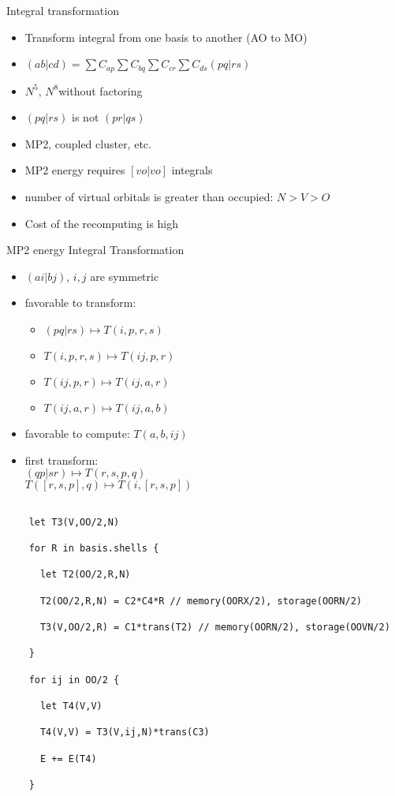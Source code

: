 \documentclass{beamer}
\begin{document}
\begin{frame}{   Integral transformation}
  \begin{itemize}
  \item Transform integral from one basis to another (AO to MO)
  \item $(ab|cd) = \sum C_{ap} \sum C_{bq} \sum C_{cr} \sum C_{ds} (pq|rs) $
  \item $N ^5 $, $N ^8 $without factoring
  \item $(pq|rs)$ is not $(pr|qs)$
  \item MP2, coupled cluster, etc.
  \item MP2  energy requires $[vo | vo] $ integrals
  \item number of virtual orbitals is greater than occupied:
    $N > V > O $
  \item Cost of the recomputing is high
  \end{itemize}
\end{frame}

\begin{frame}{MP2  energy Integral Transformation}
  \begin{itemize}
  \item $(ai|bj)$, $i,j$ are symmetric
  \item favorable to transform:
    \begin{itemize}
    \item $(pq|rs) \mapsto T(i,p,r,s)$
    \item $T(i,p,r,s) \mapsto T(ij,p,r)$
    \item $T(ij,p,r) \mapsto T(ij,a,r)$
    \item $T(ij,a,r) \mapsto T(ij,a,b)$
    \end{itemize}
  \item favorable to compute: $T(a,b,ij)$
  \item first transform: \\
    $(qp|sr) \mapsto T(r,s,p,q)$ \\
    $T([r,s,p],q) \mapsto T(i,[r,s,p])$
  \end{itemize}
\end{frame}

\tiny {
  \lstset{language=C++}
  \begin{lstlisting}[label=some-code,caption=MP2]

    let T3(V,OO/2,N)

    for R in basis.shells {

      let T2(OO/2,R,N)

      T2(OO/2,R,N) = C2*C4*R // memory(OORX/2), storage(OORN/2)

      T3(V,OO/2,R) = C1*trans(T2) // memory(OORN/2), storage(OOVN/2)

    } 

    for ij in OO/2 {

      let T4(V,V)

      T4(V,V) = T3(V,ij,N)*trans(C3)

      E += E(T4)

    }

  \end{lstlisting}
}
\normalsize
\end{document}
